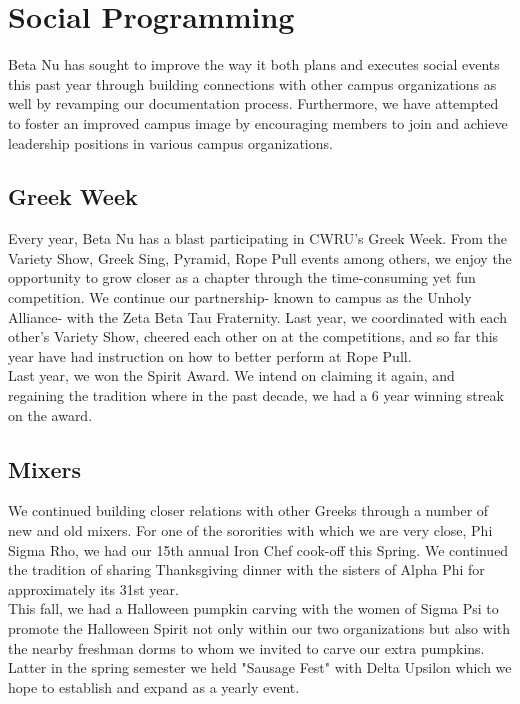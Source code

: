 \chapter{Social Programming}

  Beta Nu has sought to improve the way it both plans and executes social events this past year through building connections with other campus organizations as well by revamping our documentation process.  Furthermore, we have attempted to foster an improved campus image by encouraging members to join and achieve leadership positions in various campus organizations.
    
  \section*{Greek Week}
    Every year, Beta Nu has a blast participating in CWRU's Greek Week. From the Variety Show, Greek Sing, Pyramid, Rope Pull events among others, we enjoy the opportunity to grow closer as a chapter through the time-consuming yet fun competition. We continue our partnership- known to campus as the Unholy Alliance- with the Zeta Beta Tau Fraternity. Last year, we coordinated with each other's Variety Show, cheered each other on at the competitions, and so far this year have had instruction on how to better perform at Rope Pull. \\
    
    Last year, we won the Spirit Award. We intend on claiming it again, and regaining the tradition where in the past decade, we had a 6 year winning streak on the award.
    
  \section*{Mixers}
    
    We continued building closer relations with other Greeks through a number of new and old mixers. For one of the sororities with which we are very close, Phi Sigma Rho, we had our 15th annual Iron Chef cook-off this Spring. We continued the tradition of sharing Thanksgiving dinner with the sisters of Alpha Phi for approximately its 31st year. \\
    
    This fall, we had a Halloween pumpkin carving with the women of Sigma Psi to promote the Halloween Spirit not only within our two organizations but also with the nearby freshman dorms to whom we invited to carve our extra pumpkins.  Latter in the spring semester we held "Sausage Fest" with Delta Upsilon which we hope to establish and expand as a yearly event.
    
